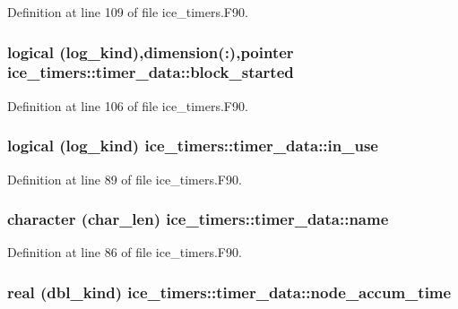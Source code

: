 Definition at line 109 of file ice\_\-timers.F90.\hypertarget{typeice__timers_1_1timer__data_a3f8a39f3783f7a747edb805baf5f3f12}{
\subsubsection[{block\_\-started}]{\setlength{\rightskip}{0pt plus 5cm}logical (log\_\-kind),dimension(:),pointer {\bf ice\_\-timers::timer\_\-data::block\_\-started}}}
\label{typeice__timers_1_1timer__data_a3f8a39f3783f7a747edb805baf5f3f12}


Definition at line 106 of file ice\_\-timers.F90.\hypertarget{typeice__timers_1_1timer__data_af1c29a0086c412b4ed465ee606c479ea}{
\subsubsection[{in\_\-use}]{\setlength{\rightskip}{0pt plus 5cm}logical (log\_\-kind) {\bf ice\_\-timers::timer\_\-data::in\_\-use}}}
\label{typeice__timers_1_1timer__data_af1c29a0086c412b4ed465ee606c479ea}


Definition at line 89 of file ice\_\-timers.F90.\hypertarget{typeice__timers_1_1timer__data_a44015dd67659a3714d03f5a79752afc8}{
\subsubsection[{name}]{\setlength{\rightskip}{0pt plus 5cm}character (char\_\-len) {\bf ice\_\-timers::timer\_\-data::name}}}
\label{typeice__timers_1_1timer__data_a44015dd67659a3714d03f5a79752afc8}


Definition at line 86 of file ice\_\-timers.F90.\hypertarget{typeice__timers_1_1timer__data_a31ab30c19c5da159423f352f392fdea7}{
\subsubsection[{node\_\-accum\_\-time}]{\setlength{\rightskip}{0pt plus 5cm}real (dbl\_\-kind) {\bf ice\_\-timers::timer\_\-data::node\_\-accum\_\-time}}}
\label{typeice__timers_1_1timer__data_a31ab30c19c5da159423f352f392fdea7}


